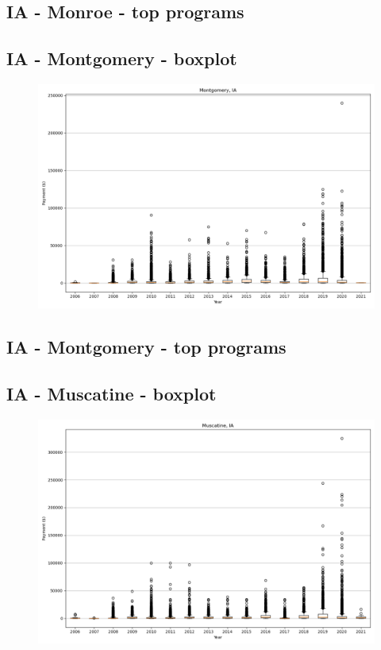 \subsection*{IA - Monroe - top programs}

\newpage
\subsection*{IA - Montgomery - boxplot}
\begin{figure}[h]
\centering
\includegraphics[width=7in]{../output/boxplots/counties/Montgomery-IA_boxplot.png}
\end{figure}


\subsection*{IA - Montgomery - top programs}

\newpage
\subsection*{IA - Muscatine - boxplot}
\begin{figure}[h]
\centering
\includegraphics[width=7in]{../output/boxplots/counties/Muscatine-IA_boxplot.png}
\end{figure}


